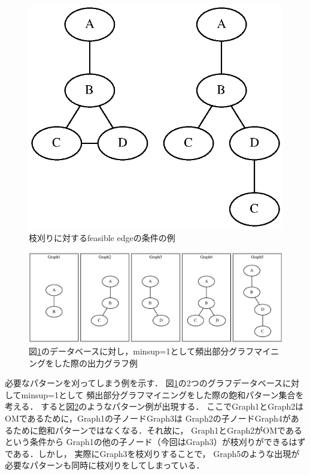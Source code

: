 \documentclass[12pt,fleqn]{jsotsuron}
\begin{document}
\begin{figure}[t]
\begin{center}
\includegraphics[scale = 0.3]{fig/gab.eps}
\end{center}
\caption{枝刈りに対するfeasible edgeの条件の例}
\label{fig:p}
\end{figure}
\begin{figure}[t]
\begin{center}
\includegraphics[scale = 0.27]{fig/gabg.eps}
\end{center}
\caption{図\ref{fig:p}のデータベースに対し，minsup=1として頻出部分グラフマイニングをした際の出力グラフ例}
\label{fig:pg}
\end{figure}

必要なパターンを刈ってしまう例を示す．
図\ref{fig:p}の2つのグラフデータベースに対してminsup=1として
頻出部分グラフマイニングをした際の飽和パターン集合を考える．
すると図\ref{fig:pg}のようなパターン例が出現する．
ここでGraph1とGraph2はOMであるために，Graph1の子ノードGraph3は
Graph2の子ノードGraph4があるために飽和パターンではなくなる．それ故に，
Graph1とGraph2がOMであるという条件から
Graph1の他の子ノード（今回はGraph3）が枝刈りができるはずである．しかし，
実際にGraph3を枝刈りすることで，
Graph5のような出現が必要なパターンも同時に枝刈りをしてしまっている．
\end{document}
